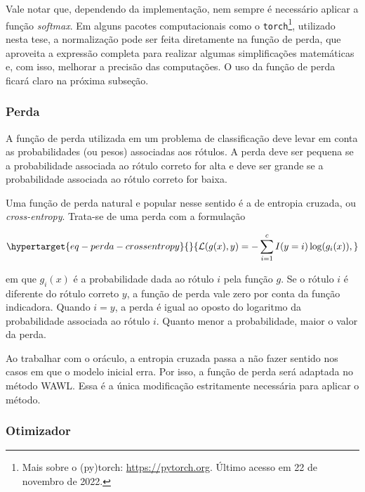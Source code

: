 \documentclass[12pt,twoside,brazilian]{book}
\begin{document}
Vale notar que, dependendo da implementação, nem sempre é necessário
aplicar a função \emph{softmax}. Em alguns pacotes computacionais como o
\texttt{torch}\footnote{Mais sobre o (py)torch:
  \url{https://pytorch.org}. Último acesso em 22 de novembro de 2022.},
utilizado nesta tese, a normalização pode ser feita diretamente na
função de perda, que aproveita a expressão completa para realizar
algumas simplificações matemáticas e, com isso, melhorar a precisão das
computações. O uso da função de perda ficará claro na próxima subseção.

\hypertarget{sec-funcao-perda-original}{%
\subsubsection{Perda}\label{sec-funcao-perda-original}}

A função de perda utilizada em um problema de classificação deve levar
em conta as probabilidades (ou pesos) associadas aos rótulos. A perda
deve ser pequena se a probabilidade associada ao rótulo correto for alta
e deve ser grande se a probabilidade associada ao rótulo correto for
baixa.

Uma função de perda natural e popular nesse sentido é a de entropia
cruzada, ou \emph{cross-entropy}. Trata-se de uma perda com a formulação

\begin{equation}\protect\hypertarget{eq-perda-crossentropy}{}{
\mathcal L(g(x), y) = -\sum_{i=1}^c I(y=i)\log(g_i(x)),
}\label{eq-perda-crossentropy}\end{equation}

em que \(g_i(x)\) é a probabilidade dada ao rótulo \(i\) pela função
\(g\). Se o rótulo \(i\) é diferente do rótulo correto \(y\), a função
de perda vale zero por conta da função indicadora. Quando \(i=y\), a
perda é igual ao oposto do logaritmo da probabilidade associada ao
rótulo \(i\). Quanto menor a probabilidade, maior o valor da perda.

Ao trabalhar com o oráculo, a entropia cruzada passa a não fazer sentido
nos casos em que o modelo inicial erra. Por isso, a função de perda será
adaptada no método WAWL. Essa é a única modificação estritamente
necessária para aplicar o método.

\hypertarget{sec-otimizador}{%
\subsubsection{Otimizador}\label{sec-otimizador}}
\end{document}
